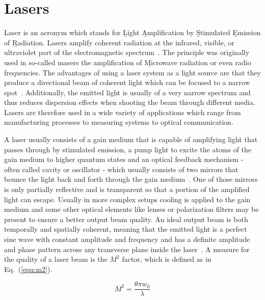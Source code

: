 \documentclass[a4paper,10pt]{article}
\newcommand{\equref}[1]{Eq.~(\ref{#1})}
\begin{document}
    \newpage

    \section{Lasers}

    Laser is an acronym which stands for \b{L}ight \b{A}mplification
    by \b{S}timulated \b{E}mission of \b{R}adiation.
    Lasers amplify coherent radiation at the infrared, visible, or
    ultraviolet part of the electromagnetic spectrum~\cite{lasers_siegman}.
    The principle was originally used in so-called masers the 
    amplification of \b{M}icrowave radiation or even radio frequencies.
    The advantages of using a laser system as a light source are that
    they produce a directional beam of coherent light which can be 
    focused to a narrow spot~\cite{lasers_liverpool}.
    Additionally, the emitted light is usually of a very narrow spectrum
    and thus reduces dispersion effects when shooting the beam through
    different media.
    Lasers are therefore used in a wide variety of applications which
    range from manufacturing processes to measuring systems to 
    optical communication.

    A laser usually consists of a gain medium that is capable of amplifying
    light that passes through by stimulated emission, a pump light to
    excite the atoms of the gain medium to higher quantum states and
    an optical feedback mechanism - often called cavity or oscillator - 
    which usually
    consists of two mirrors that bounce the light back and forth through
    the gain medium~\cite{lasers_siegman}.
    One of those mirrors is only partially reflective and is transparent
    so that a portion of the amplified light can escape.
    Usually in more complex setups cooling is applied to the gain medium
    and some other optical elements like
    lenses or polarization filters may be present to ensure a better
    output beam quality.
    An ideal output beam is both temporally and spatially coherent,
    meaning that the emitted light is a perfect sine wave with constant
    amplitude and frequency and has a definite amplitude and phase pattern
    across any transverse plane inside the laser~\cite{lasers_siegman}.
    A measure for the quality of a laser beam is the $M^2$ factor, which
    is defined as in \equref{equ:m2}.

    \begin{equation}
        \label{equ:m2}
        M^2 = \frac{\theta \pi w_0}{\lambda}
    \end{equation}
\end{document}
